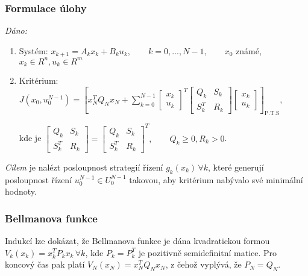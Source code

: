 \subsubsection*{Formulace úlohy}
\textit{Dáno:}
\begin{enumerate}
\item Systém: $ x_{k+1} = A_k x_k + B_k u_k, \qquad k=0,...,N-1, \qquad x_0 $ známé, $ x_k \in R^n, u_k \in R^m $
\item Kritérium: $ J(x_0, u_0^{N-1}) = \left[ x_N^T Q_N x_N + \displaystyle{\sum_{k=0}^{N-1}} \begin{bmatrix} x_k \\ u_k \end{bmatrix}^T \begin{bmatrix} Q_k & S_k \\ S_k^T & R_k \end{bmatrix} \begin{bmatrix} x_k \\ u_k \end{bmatrix} \right]_{\mathrm{P.T.S}} $, 

kde je $ \begin{bmatrix} Q_k & S_k \\ S_k^T & R_k \end{bmatrix} = \begin{bmatrix} Q_k & S_k \\ S_k^T & R_k \end{bmatrix}^T, \qquad Q_k \geq 0, R_k > 0 $.
\end{enumerate}
\textit{Cílem} je nalézt posloupnost strategií řízení $ g_k(x_k) \, \forall k $, které generují posloupnost řízení $ u_0^{N-1} \in U_0^{N-1} $ takovou, aby kritérium nabývalo své minimální hodnoty.

\subsubsection*{Bellmanova funkce}
Indukcí lze dokázat, že Bellmanova funkce je dána kvadratickou formou $ V_k(x_k) = x_k^T P_k x_k \, \forall k $, kde $ P_k = P_k^T $ je pozitivně semidefinitní matice. Pro koncový čas pak platí $ V_N(x_N) = x_N^T Q_N x_N $, z čehož vyplývá, že $ P_N = Q_N $.

